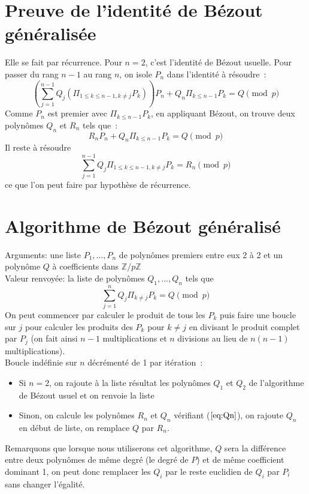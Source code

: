 \documentclass[a4paper,11pt]{book}
\begin{document}
\begin{giacjshere}
\section{Preuve de l'identité de Bézout généralisée}
Elle se fait par récurrence. Pour $n=2$, c'est l'identité de Bézout usuelle. 
Pour passer
du rang $n-1$ au rang $n$, on isole $P_n$ dans l'identité à résoudre~:
\[ \left( 
\sum_{j=1}^{n-1} Q_j (\Pi_{1 \leq k \leq n-1,k\neq j} P_k) \right) P_n + 
Q_n \Pi_{k\leq n-1} P_k =Q \pmod p\]
Comme $P_n$ est premier avec $\Pi_{k\leq n-1} P_k$, en appliquant Bézout,
on trouve deux polynômes $Q_n$ et $R_n$ tels que~:
\begin{equation} \label{eq:Qn}
 R_n P_n + Q_n \Pi_{k\leq n-1} P_k =Q \pmod p 
\end{equation}
Il reste à résoudre
\[ \sum_{j=1}^{n-1} Q_j \Pi_{1 \leq k \leq n-1,k\neq j} P_k=R_n \pmod p\]
ce que l'on peut faire par hypothèse de récurrence.

\section{Algorithme de Bézout généralisé}
Arguments: une liste $P_1,...,P_n$ de polynômes premiers entre eux 2 à 2  
et un polynôme $Q$ à coefficients dans $\mathbb{Z}/p\mathbb{Z}$\\
Valeur renvoyée: la liste de polynômes $Q_1,...,Q_n$ tels que
\[ \sum_{j=1}^n Q_j \Pi_{k\neq j} P_k=Q \pmod p \]
On peut commencer par calculer le produit de tous les $P_k$ puis faire une 
boucle sur $j$ pour calculer les produits des $P_k$ pour $k\neq j$ en divisant
le produit complet par $P_j$ (on fait ainsi $n-1$ multiplications et
$n$ divisions au lieu de $n(n-1)$ multiplications).\\
Boucle indéfinie sur $n$ décrémenté de 1 par itération~:
\begin{itemize}
\item Si $n=2$, on rajoute à la liste résultat les polynômes 
$Q_1$ et $Q_2$ de l'algorithme de Bézout usuel et on renvoie la liste
\item Sinon, on calcule les polynômes $R_n$ et $Q_n$ vérifiant (\(\ref{eq:Qn}\)),
on rajoute $Q_n$ en début de liste, on remplace $Q$ par $R_n$.
\end{itemize}
Remarquons que lorsque nous utiliserons cet algorithme, $Q$ sera la différence
entre deux polynômes de même degré (le degré de $P$) et de même coefficient
dominant 1, on peut donc
remplacer les $Q_i$ par le reste euclidien de $Q_i$ par $P_i$ sans
changer l'égalité.



\end{giacjshere}
\end{document}
